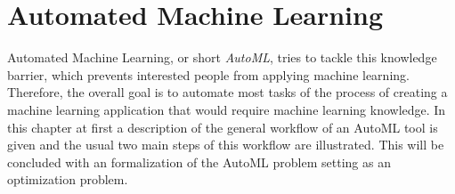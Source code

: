 \section{Automated Machine Learning}
\label{sec:theory:automl}
Automated Machine Learning, or short \textit{AutoML}, tries to tackle this knowledge barrier, which prevents interested people from applying machine learning.
Therefore, the overall goal is to automate most tasks of the process of creating a machine learning application that would require machine learning knowledge.\newline
In this chapter at first a description of the general workflow of an AutoML tool is given and the usual two main steps of this workflow are illustrated.
This will be concluded with an formalization of the AutoML problem setting as an optimization problem.

